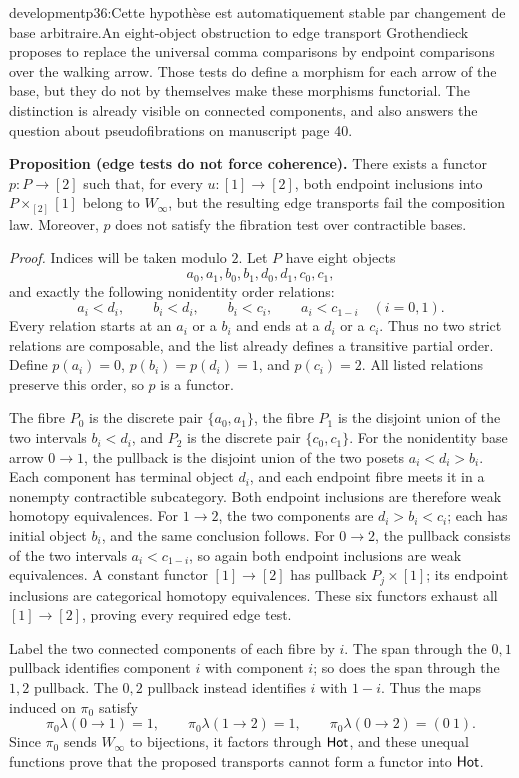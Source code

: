 \begin{dcomment}{development}{p36:Cette hypothèse est automatiquement stable par changement de base arbitraire.}{An eight-object obstruction to edge transport}
Grothendieck proposes to replace the universal comma comparisons by endpoint comparisons over the walking arrow. Those tests do define a morphism for each arrow of the base, but they do not by themselves make these morphisms functorial. The distinction is already visible on connected components, and also answers the question about pseudofibrations on manuscript page 40.

\textbf{Proposition (edge tests do not force coherence).}\ours
There exists a functor $p:P\to[2]$ such that, for every $u:[1]\to[2]$, both endpoint inclusions into $P\times_{[2]}[1]$ belong to $W_\infty$, but the resulting edge transports fail the composition law. Moreover, $p$ does not satisfy the fibration test over contractible bases.

\emph{Proof.} Indices will be taken modulo $2$. Let $P$ have eight objects
\[
 a_0,a_1,b_0,b_1,d_0,d_1,c_0,c_1,
\]
and exactly the following nonidentity order relations:
\[
 a_i<d_i,\qquad b_i<d_i,\qquad
 b_i<c_i,\qquad a_i<c_{1-i}\quad(i=0,1).
\]
Every relation starts at an $a_i$ or a $b_i$ and ends at a $d_i$ or a $c_i$. Thus no two strict relations are composable, and the list already defines a transitive partial order. Define $p(a_i)=0$, $p(b_i)=p(d_i)=1$, and $p(c_i)=2$. All listed relations preserve this order, so $p$ is a functor.

The fibre $P_0$ is the discrete pair $\{a_0,a_1\}$, the fibre $P_1$ is the disjoint union of the two intervals $b_i<d_i$, and $P_2$ is the discrete pair $\{c_0,c_1\}$. For the nonidentity base arrow $0\to1$, the pullback is the disjoint union of the two posets $a_i<d_i>b_i$. Each component has terminal object $d_i$, and each endpoint fibre meets it in a nonempty contractible subcategory. Both endpoint inclusions are therefore weak homotopy equivalences. For $1\to2$, the two components are $d_i>b_i<c_i$; each has initial object $b_i$, and the same conclusion follows. For $0\to2$, the pullback consists of the two intervals $a_i<c_{1-i}$, so again both endpoint inclusions are weak equivalences. A constant functor $[1]\to[2]$ has pullback $P_j\times[1]$; its endpoint inclusions are categorical homotopy equivalences. These six functors exhaust all $[1]\to[2]$, proving every required edge test.

Label the two connected components of each fibre by $i$. The span through the $0,1$ pullback identifies component $i$ with component $i$; so does the span through the $1,2$ pullback. The $0,2$ pullback instead identifies $i$ with $1-i$. Thus the maps induced on $\pi_0$ satisfy
\[
 \pi_0\lambda(0\to1)=1,\qquad
 \pi_0\lambda(1\to2)=1,\qquad
 \pi_0\lambda(0\to2)=(0\ 1).
\]
Since $\pi_0$ sends $W_\infty$ to bijections, it factors through $\mathsf{Hot}$, and these unequal functions prove that the proposed transports cannot form a functor into $\mathsf{Hot}$.


\end{dcomment}
